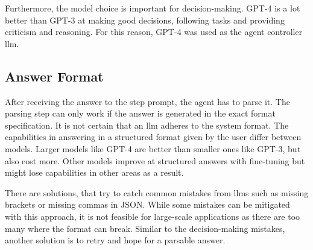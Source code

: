 \documentclass[../main.tex]{subfiles}
\begin{document}
Furthermore, the model choice is important for decision-making.
GPT-4 is a lot better than GPT-3 at making good decisions, following tasks and providing
criticism and reasoning.
For this reason, GPT-4 was used as the agent controller \gls{llm}.

\subsection{Answer Format}

After receiving the answer to the step prompt, the agent has to parse it.
The parsing step can only work if the answer is generated in the exact format specification.
It is not certain that an \gls{llm} adheres to the system format.
The capabilities in answering in a structured format given by the user differ between models.
Larger models like GPT-4 are better than smaller ones like GPT-3, but also cost more.
Other models improve at structured answers with fine-tuning
but might lose capabilities in other areas as a result.

There are solutions, that try to catch common mistakes from \glspl{llm}
such as missing brackets or missing commas in JSON.
While some mistakes can be mitigated with this approach, it is not feasible
for large-scale applications as there are too many where the format can break.
Similar to the decision-making mistakes, another solution is to retry
and hope for a parsable answer.
\end{document}
